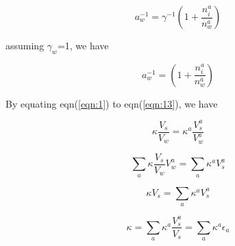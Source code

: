 \documentclass[12pt]{article}
\begin{document}
\begin{equation}
a_{w}^{-1}=\gamma^{-1} (1+\frac{n_{i}^{a}}{n_{w}^{a}})
\end{equation}

assuming $\gamma_{w}$=1, we have 

\begin{equation}\label{eqn:13}
a_{w}^{-1}=(1+\frac{n_{i}^{a}}{n_{w}^{a}})
\end{equation}

By equating eqn(\ref{eqn:1}) to eqn(\ref{eqn:13}), we have

\begin{equation}
\kappa \frac{V_{s}}{V_{w}}= \kappa^{a} \frac{V_{s}^{a}}{V_{w}^{a}}
\end{equation}

\begin{equation}
\sum_{a} \kappa \frac{V_{s}}{V_{w}} V_{w}^{a}= \sum_{a} \kappa^{a} V_{s}^{a}
\end{equation}

\begin{equation}
\kappa V_{s}= \sum_{a} \kappa^{a} V_{s}^{a}
\end{equation}

\begin{equation}
\kappa= \sum_{a} \kappa^{a} \frac {V_{s}^{a}}{V_{s}} = \sum_{a} \kappa^{a} \epsilon_{a}
\end{equation}
\end{document}
